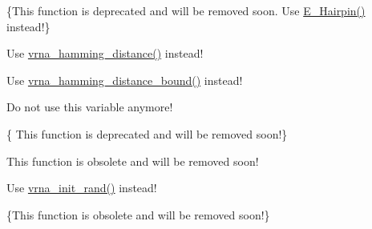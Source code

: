 \begin{DoxyRefList}
\item[\label{deprecated__deprecated000074}%
\hypertarget{deprecated__deprecated000074}{}%
Global \hyperlink{group__mfe__fold__single_gab327ce11972f5ac069d52c8dedfdb700}{Hairpin\-E} (int size, int type, int si1, int sj1, const char $\ast$string)]\{This function is deprecated and will be removed soon. Use \hyperlink{group__loops_gadf943ee9a45b7f4cee9192c06210dace}{E\-\_\-\-Hairpin()} instead!\}  
\item[\label{deprecated__deprecated000127}%
\hypertarget{deprecated__deprecated000127}{}%
Global \hyperlink{string__utils_8h_ad9dc7bfc9aa664dc6698f17ce07fc7e7}{hamming} (const char $\ast$s1, const char $\ast$s2)]Use \hyperlink{group__string__utils_ga301798b43b6f66687985c725efd14f32}{vrna\-\_\-hamming\-\_\-distance()} instead!  
\item[\label{deprecated__deprecated000128}%
\hypertarget{deprecated__deprecated000128}{}%
Global \hyperlink{string__utils_8h_a96d3c36717d624514055ce201cab1542}{hamming\-\_\-bound} (const char $\ast$s1, const char $\ast$s2, int n)]Use \hyperlink{group__string__utils_ga5d1c2271e79d9bcb52d4e68360763fb9}{vrna\-\_\-hamming\-\_\-distance\-\_\-bound()} instead!  
\item[\label{deprecated__deprecated000078}%
\hypertarget{deprecated__deprecated000078}{}%
Global \hyperlink{fold__vars_8h_a92089ae3a51b5d75a14ce9cc29cc8317}{iindx} ]Do not use this variable anymore!  
\item[\label{deprecated__deprecated000114}%
\hypertarget{deprecated__deprecated000114}{}%
Global \hyperlink{part__func__co_8h_aa12dda9dd6179cdd22bcce87c0682c07}{init\-\_\-co\-\_\-pf\-\_\-fold} (int length)]\{ This function is deprecated and will be removed soon!\}  
\item[\label{deprecated__deprecated000103}%
\hypertarget{deprecated__deprecated000103}{}%
Global \hyperlink{part__func_8h_a15176e23eceeff8c7d14eabcfec8a2af}{init\-\_\-pf\-\_\-fold} (int length)]This function is obsolete and will be removed soon!  
\item[\label{deprecated__deprecated000152}%
\hypertarget{deprecated__deprecated000152}{}%
Global \hyperlink{utils_8h_a8aaa6d9be6f803f496d9b97375c371f3}{init\-\_\-rand} (void)]Use \hyperlink{group__utils_ga0ad1f40ea316e5c5918695c35613027a}{vrna\-\_\-init\-\_\-rand()} instead!  
\item[\label{deprecated__deprecated000038}%
\hypertarget{deprecated__deprecated000038}{}%
Global \hyperlink{group__mfe__cofold_gafee0c32208aa2ac97338b6e3fbad7fa5}{initialize\-\_\-cofold} (int length)]\{This function is obsolete and will be removed soon!\}  

\end{DoxyRefList}
